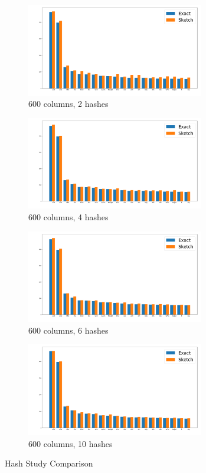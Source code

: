 \documentclass[shortpaper]{revdetua}
\begin{document}
\begin{figure}[ht]
    \onecolumn
    \begin{subfigure}[t]{0.5\textwidth}
        \includegraphics[height=1.6in]{englishAlice600_2.png}
        \caption{600 columns, 2 hashes} 
    \end{subfigure}
    \begin{subfigure}[t]{0.5\textwidth}
        \includegraphics[height=1.6in]{englishAlice600_4.png}
        \caption{600 columns, 4 hashes}
    \end{subfigure}
    \begin{subfigure}[t]{0.5\textwidth}
        \includegraphics[height=1.6in]{englishAlice600_6.png}
        \caption{600 columns, 6 hashes}
    \end{subfigure}
    \begin{subfigure}[t]{0.5\textwidth}
        \includegraphics[height=1.6in]{englishAlice600_10.png}
        \caption{600 columns, 10 hashes}
    \end{subfigure}
    \caption{Hash Study Comparison}
    \label{fig:hashSketchComp}
\end{figure}
\end{document}
